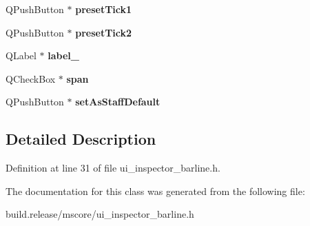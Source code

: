 \begin{DoxyCompactItemize}
\mbox{\label{class_ui___inspector_bar_line_aa81b7ca4e60c1231ba3a9765f50e1d40}} 
Q\+Push\+Button $\ast$ {\bfseries preset\+Tick1}
\item 
\mbox{\label{class_ui___inspector_bar_line_addc14980cdbcee5f051fa79e1ea47121}} 
Q\+Push\+Button $\ast$ {\bfseries preset\+Tick2}
\item 
\mbox{\label{class_ui___inspector_bar_line_ad325da7f88e6a75caea334bd8a6a1d0d}} 
Q\+Label $\ast$ {\bfseries label\+\_}
\item 
\mbox{\label{class_ui___inspector_bar_line_a41e6078f045e466c3f1440611c8e268d}} 
Q\+Check\+Box $\ast$ {\bfseries span}
\item 
\mbox{\label{class_ui___inspector_bar_line_ae3f80559beaa27fed18cb4c8c4b2810e}} 
Q\+Push\+Button $\ast$ {\bfseries set\+As\+Staff\+Default}
\end{DoxyCompactItemize}


\subsection{Detailed Description}


Definition at line 31 of file ui\+\_\+inspector\+\_\+barline.\+h.



The documentation for this class was generated from the following file\+:\begin{DoxyCompactItemize}
\item 
build.\+release/mscore/ui\+\_\+inspector\+\_\+barline.\+h\end{DoxyCompactItemize}
